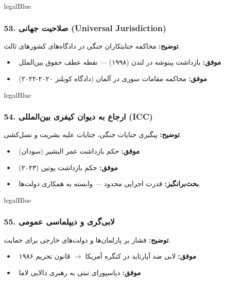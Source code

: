\documentclass[a4paper,12pt]{article}
\newcommand{\success}[1]{\textcolor{greenPrimary}{\faCheckCircle\ \textbf{موفق:}} #1}
\newcommand{\debate}[1]{\textcolor{orangePrimary}{\faQuestionCircle\ \textbf{بحث‌برانگیز:}} #1}
\newcommand{\methodnum}[1]{\textcolor{purpleLight}{\textbf{#1.}}}
\begin{document}
\begin{methodcard}{legalBlue}
\subsubsection{\methodnum{53} صلاحیت جهانی (Universal Jurisdiction)}
\textbf{توضیح:} محاکمه جنایتکاران جنگی در دادگاه‌های کشورهای ثالث.

\begin{itemize}[label=\textcolor{greenPrimary}{\faCheckCircle}]
  \item \success{بازداشت پینوشه در لندن (۱۹۹۸) — نقطه عطف حقوق بین‌الملل}
  \item \success{محاکمه مقامات سوری در آلمان (دادگاه کوبلنز ۲۰۲۰-۲۰۲۲)}
\end{itemize}
\end{methodcard}

\begin{methodcard}{legalBlue}
\subsubsection{\methodnum{54} ارجاع به دیوان کیفری بین‌المللی (ICC)}
\textbf{توضیح:} پیگیری جنایات جنگی، جنایات علیه بشریت و نسل‌کشی.

\begin{itemize}[label=\textcolor{greenPrimary}{\faCheckCircle}]
  \item \success{حکم بازداشت عمر البشیر (سودان)}
  \item \success{حکم بازداشت پوتین (۲۰۲۳)}
\end{itemize}
\begin{itemize}[label=\textcolor{yellowPrimary}{\faExclamationTriangle}]
  \item \debate{قدرت اجرایی محدود — وابسته به همکاری دولت‌ها.}
\end{itemize}
\end{methodcard}

\begin{methodcard}{legalBlue}
\subsubsection{\methodnum{55} لابی‌گری و دیپلماسی عمومی}
\textbf{توضیح:} فشار بر پارلمان‌ها و دولت‌های خارجی برای حمایت.

\begin{itemize}[label=\textcolor{greenPrimary}{\faCheckCircle}]
  \item \success{لابی ضد آپارتاید در کنگره آمریکا $\rightarrow$ قانون تحریم ۱۹۸۶}
  \item \success{دیاسپورای تبتی به رهبری دالایی لاما}
\end{itemize}
\end{methodcard}
\end{document}
